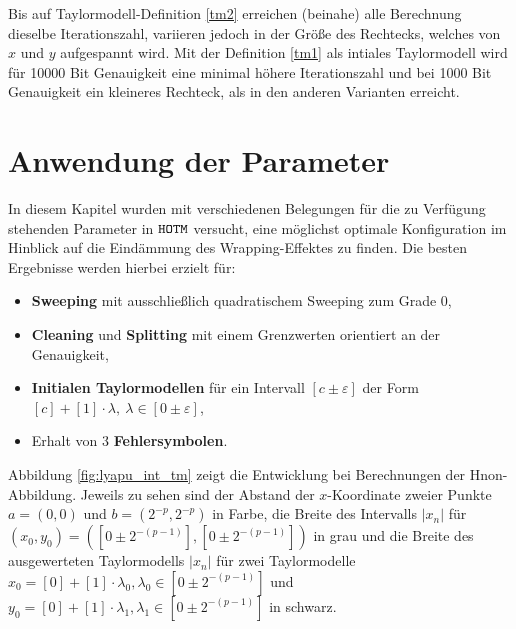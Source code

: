  
Bis auf Taylormodell-Definition \ref{tm2} erreichen (beinahe) alle Berechnung dieselbe Iterationszahl, variieren jedoch in der Größe des Rechtecks, welches von $x$ und $y$ aufgespannt wird. Mit der Definition \ref{tm1} als intiales Taylormodell wird für 10000 Bit Genauigkeit eine minimal höhere Iterationszahl und bei 1000 Bit Genauigkeit ein kleineres Rechteck, als in den anderen Varianten erreicht.
 
 \section{Anwendung der Parameter}
 In diesem Kapitel wurden mit verschiedenen Belegungen für die zu Verfügung stehenden Parameter in $\verb+HOTM+$ versucht, eine möglichst optimale Konfiguration im Hinblick auf die Eindämmung des Wrapping-Effektes zu finden. Die besten Ergebnisse werden hierbei erzielt für: 
 \begin{itemize}
  \item \textbf{Sweeping} mit ausschließlich quadratischem Sweeping zum Grade 0,
  \item \textbf{Cleaning} und \textbf{Splitting} mit einem Grenzwerten orientiert an der Genauigkeit,
  \item \textbf{Initialen Taylormodellen} für ein Intervall $[c \pm \varepsilon]$ der Form $[c] + [1] \cdot \lambda,\  \lambda \in [0 \pm \varepsilon]$,
  \item Erhalt von 3 \textbf{Fehlersymbolen}.
 \end{itemize}
Abbildung \ref{fig:lyapu_int_tm} zeigt die Entwicklung bei Berechnungen der H\e non-Abbildung. Jeweils zu sehen sind der Abstand der $x$-Koordinate zweier Punkte $a=(0,0)$ und $b=(2^{-p},2^{-p})$ in Farbe, die Breite des Intervalls $|x_n|$ für $(x_0, y_0)=([0\pm 2^{-(p-1)}],[0\pm 2^{-(p-1)}])$ in grau und die Breite des ausgewerteten Taylormodells $|x_n|$ für zwei Taylormodelle $x_0 = [0] + [1]\cdot \lambda_0, \lambda_0\in [0\pm 2^{-(p-1)}]$ und $y_0 = [0] + [1]\cdot \lambda_1, \lambda_1\in [0\pm 2^{-(p-1)}]$ in schwarz. 
 
 
 
